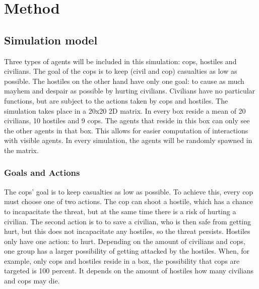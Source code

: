 \section{Method}
\subsection{Simulation model}
Three types of agents will be included in this simulation: cops, hostiles and civilians.
The goal of the cops is to keep (civil and cop) casualties as low as possible.
The hostiles on the other hand have only one goal: to cause as much mayhem and despair as possible by hurting civilians.
Civilians have no particular functions, but are subject to the actions taken by cops and hostiles.
The simulation takes place in a 20x20 2D matrix.
In every box reside a mean of 20 civilians, 10 hostiles and 9 cops.
The agents that reside in this box can only see the other agents in that box.
This allows for easier computation of interactions with visible agents.
In every simulation, the agents will be randomly spawned in the matrix.


\subsubsection{Goals and Actions}
The cops' goal is to keep casualties as low as possible.
To achieve this, every cop must choose one of two actions.
The cop can shoot a hostile, which has a chance to incapacitate the threat, but at the same time there is a risk of hurting a civilian.
The second action is to to save a civilian, who is then safe from getting hurt, but this does not incapacitate any hostiles, so the threat persists. 
Hostiles only have one action: to hurt.
Depending on the amount of civilians and cops, one group has a larger possibility of getting attacked by the hostiles.
When, for example, only cops and hostiles reside in a box, the possibility that cops are targeted is 100 percent.
It depends on the amount of hostiles how many civilians and cops may die.

